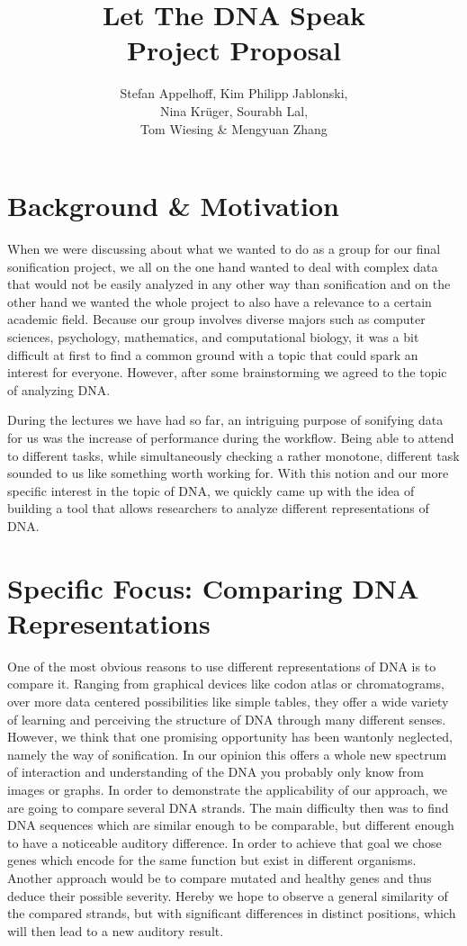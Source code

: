 \documentclass[12pt]{article}
\title{Let The DNA Speak\\Project Proposal}
\author{Stefan Appelhoff, Kim Philipp Jablonski, \\Nina Krüger, Sourabh Lal, \\Tom Wiesing \& Mengyuan Zhang}
\begin{document}
\maketitle

\tableofcontents

\section{Background \& Motivation}

When we were discussing about what we wanted to do as a group for our final sonification project, we all on the one hand wanted to deal with complex data that would not be easily analyzed in any other way than sonification and on the other hand we wanted the whole project to also have a relevance to a certain academic field. Because our group involves diverse majors such as computer sciences, psychology, mathematics, and computational biology, it was a bit difficult at first to find a common ground with a topic that could spark an interest for everyone. However, after some brainstorming we agreed to the topic of analyzing DNA.

During the lectures we have had so far, an intriguing purpose of sonifying data for us was the increase of performance during the workflow. Being able to attend to different tasks, while simultaneously checking a rather monotone, different task sounded to us like something worth working for. With this notion and our more specific interest in the topic of DNA, we quickly came up with the idea of building a tool that allows researchers to analyze different representations of DNA.

\section{Specific Focus: Comparing DNA Representations}

One of the most obvious reasons to use different representations of DNA is to compare it. Ranging from graphical devices like codon atlas or chromatograms, over more data centered possibilities like simple tables, they offer a wide variety of learning and perceiving the structure of DNA through many different senses.
However, we think that one promising opportunity has been wantonly neglected, namely the way of sonification. In our opinion this offers a whole new spectrum of interaction and understanding of the DNA you probably only know from images or graphs.
In order to demonstrate the applicability of our approach, we are going to compare several DNA strands. The main difficulty then was to find DNA sequences which are similar enough to be comparable, but different enough to have a noticeable auditory difference.
In order to achieve that goal we chose genes which encode for the same function but exist in different organisms. Another approach would be to compare mutated and healthy genes and thus deduce their possible severity. Hereby we hope to observe a general similarity of the compared strands, but with significant differences in distinct positions, which will then lead to a new auditory result.
\end{document}
